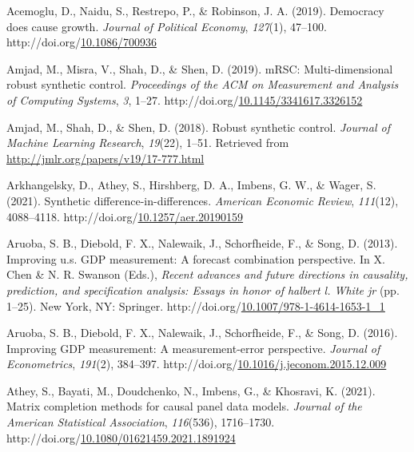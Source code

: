 \documentclass[12pt,nobind, a4paper]{reedthesis}
\newlength{\cslhangindent}
\newenvironment{CSLReferences}[2] %
{%
	\setlength{\parindent}{0pt}
	\ifodd #1 \everypar{\setlength{\hangindent}{\cslhangindent}}\ignorespaces\fi
	\ifnum #2 > 0
	\setlength{\parskip}{#2\baselineskip}
	\fi
}%
{}
\begin{document}
\begin{CSLReferences}{1}{0}
 \leavevmode{}%
 Acemoglu, D., Naidu, S., Restrepo, P., \& Robinson, J. A. (2019). Democracy does cause growth. \emph{Journal of Political Economy}, \emph{127}(1), 47--100. http://doi.org/\href{https://doi.org/10.1086/700936}{10.1086/700936}

 \leavevmode{}%
 Amjad, M., Misra, V., Shah, D., \& Shen, D. (2019). {mRSC}: Multi-dimensional robust synthetic control. \emph{Proceedings of the {ACM} on Measurement and Analysis of Computing Systems}, \emph{3}, 1--27. http://doi.org/\href{https://doi.org/10.1145/3341617.3326152}{10.1145/3341617.3326152}

 \leavevmode{}%
 Amjad, M., Shah, D., \& Shen, D. (2018). Robust synthetic control. \emph{Journal of Machine Learning Research}, \emph{19}(22), 1--51. Retrieved from \url{http://jmlr.org/papers/v19/17-777.html}

 \leavevmode{}%
 Arkhangelsky, D., Athey, S., Hirshberg, D. A., Imbens, G. W., \& Wager, S. (2021). Synthetic difference-in-differences. \emph{American Economic Review}, \emph{111}(12), 4088--4118. http://doi.org/\href{https://doi.org/10.1257/aer.20190159}{10.1257/aer.20190159}

 \leavevmode{}%
 Aruoba, S. B., Diebold, F. X., Nalewaik, J., Schorfheide, F., \& Song, D. (2013). Improving u.s. {GDP} measurement: A forecast combination perspective. In X. Chen \& N. R. Swanson (Eds.), \emph{Recent advances and future directions in causality, prediction, and specification analysis: Essays in honor of halbert l. White jr} (pp. 1--25). New York, {NY}: Springer. http://doi.org/\href{https://doi.org/10.1007/978-1-4614-1653-1_1}{10.1007/978-1-4614-1653-1\_1}

 \leavevmode{}%
 Aruoba, S. B., Diebold, F. X., Nalewaik, J., Schorfheide, F., \& Song, D. (2016). Improving {GDP} measurement: A measurement-error perspective. \emph{Journal of Econometrics}, \emph{191}(2), 384--397. http://doi.org/\href{https://doi.org/10.1016/j.jeconom.2015.12.009}{10.1016/j.jeconom.2015.12.009}

 \leavevmode{}%
 Athey, S., Bayati, M., Doudchenko, N., Imbens, G., \& Khosravi, K. (2021). Matrix completion methods for causal panel data models. \emph{Journal of the American Statistical Association}, \emph{116}(536), 1716--1730. http://doi.org/\href{https://doi.org/10.1080/01621459.2021.1891924}{10.1080/01621459.2021.1891924}


\end{CSLReferences}
\end{document}
